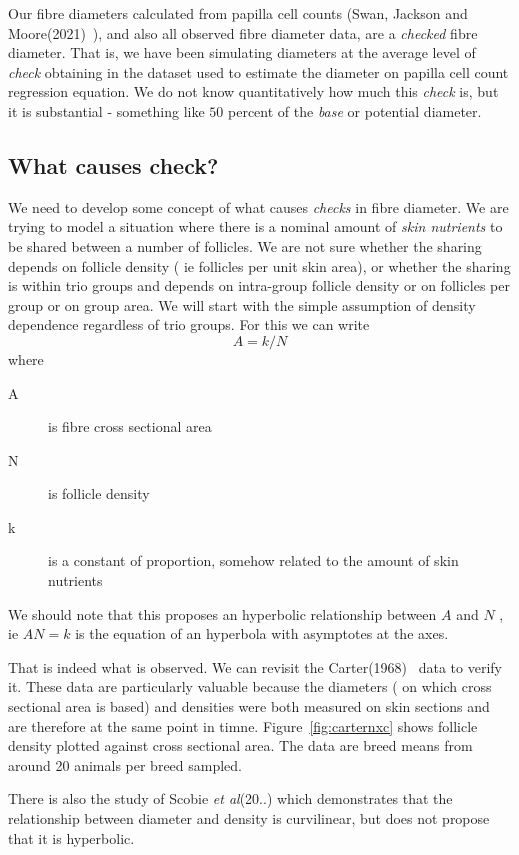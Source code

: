 \documentclass[titlepage]{article}  %
\begin{document}
Our fibre diameters calculated from papilla cell counts (Swan, Jackson and Moore(2021)~\cite{swan:21}), and also all observed fibre diameter data, are a {\em checked} fibre diameter. That is, we have been simulating diameters at the average level of {\em check} obtaining in the dataset used to estimate the diameter on papilla cell count regression equation. We do not know quantitatively how much this {\em check} is, but it is substantial - something like $50$ percent of the {\em base} or potential diameter. 

\subsection{What causes check?}
We need to develop some concept of what causes {\em checks} in fibre diameter. We are trying to model a situation where there is a nominal amount of {\em skin nutrients} to be shared between a number of follicles. We are not sure whether the sharing depends on follicle density ( ie follicles per unit skin area), or whether the sharing is within trio groups and depends on intra-group follicle density  or on follicles per group or on group area. We will start with the simple assumption of density dependence regardless of trio groups. For this we can write
\begin{displaymath}
A = k/N
\end{displaymath}
where
\begin{description}
\item[A] is fibre cross sectional area
\item[N] is follicle density
\item[k] is a constant of proportion, somehow related to the amount of skin nutrients
\end{description}
We should note that this proposes an hyperbolic relationship between $A$ and $N$ , ie $AN = k$ is the equation of an hyperbola with asymptotes at the axes. 

That is indeed what is observed. We can revisit the Carter(1968)~\cite{cart:68} data to verify it. These data are particularly valuable because the diameters ( on which cross sectional area is based) and densities were both measured on skin sections and are therefore at the same point in timne.  Figure~\ref{fig:carternxc} shows follicle density plotted against cross sectional area. The data are breed means from around 20 animals per breed sampled.

There is also the study of Scobie {\em et al}(20..) which demonstrates that the relationship between diameter and density is curvilinear, but does not propose that it is hyperbolic.
\end{document}
